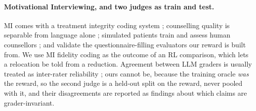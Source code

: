 \paragraph{Motivational Interviewing, and two judges as train and test.} MI \citep{miller1991mi}
comes with a treatment integrity coding system \citep{moyers2016miti}; counselling quality is
separable from language alone \citep{perezrosas2019goodcounselor}; simulated patients train and
assess human counsellors \citep{steenstra2025scaffolding}; and \citet{yosef2024assessing}
validate the questionnaire-filling evaluators our reward is built from. We use MI fidelity
coding as the outcome of an RL comparison, which lets a relocation be told from a reduction. Agreement between LLM graders is usually treated as inter-rater reliability
\citep{zheng2023judging,koo2016icc}; ours cannot be, because the training oracle \emph{was} the
reward, so the second judge is a held-out split on the reward, never pooled with it, and their
disagreements are reported as findings about which claims are grader-invariant.
